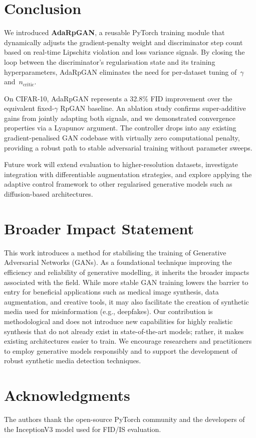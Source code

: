 \documentclass{article}
\newcommand{\ncritic}{n_{\mathrm{critic}}}
\begin{document}
\section{Conclusion}
\label{sec:conclusion}

We introduced \textbf{AdaRpGAN}, a reusable PyTorch training module that dynamically adjusts the gradient-penalty weight and discriminator step count based on real-time Lipschitz violation and loss variance signals. By closing the loop between the discriminator's regularisation state and its training hyperparameters, AdaRpGAN eliminates the need for per-dataset tuning of~$\gamma$ and~$\ncritic$.

On CIFAR-10, AdaRpGAN represents a 32.8\% FID improvement over the equivalent fixed-$\gamma$ RpGAN baseline. An ablation study confirms super-additive gains from jointly adapting both signals, and we demonstrated convergence properties via a Lyapunov argument. The controller drops into any existing gradient-penalised GAN codebase with virtually zero computational penalty, providing a robust path to stable adversarial training without parameter sweeps.

Future work will extend evaluation to higher-resolution datasets, investigate integration with differentiable augmentation strategies, and explore applying the adaptive control framework to other regularised generative models such as diffusion-based architectures.

\section*{Broader Impact Statement}

This work introduces a method for stabilising the training of Generative Adversarial Networks (GANs). As a foundational technique improving the efficiency and reliability of generative modelling, it inherits the broader impacts associated with the field. While more stable GAN training lowers the barrier to entry for beneficial applications such as medical image synthesis, data augmentation, and creative tools, it may also facilitate the creation of synthetic media used for misinformation (e.g., deepfakes). Our contribution is methodological and does not introduce new capabilities for highly realistic synthesis that do not already exist in state-of-the-art models; rather, it makes existing architectures easier to train. We encourage researchers and practitioners to employ generative models responsibly and to support the development of robust synthetic media detection techniques.

\section*{Acknowledgments}

The authors thank the open-source PyTorch community and the developers of the InceptionV3 model used for FID/IS evaluation.



\end{document}
